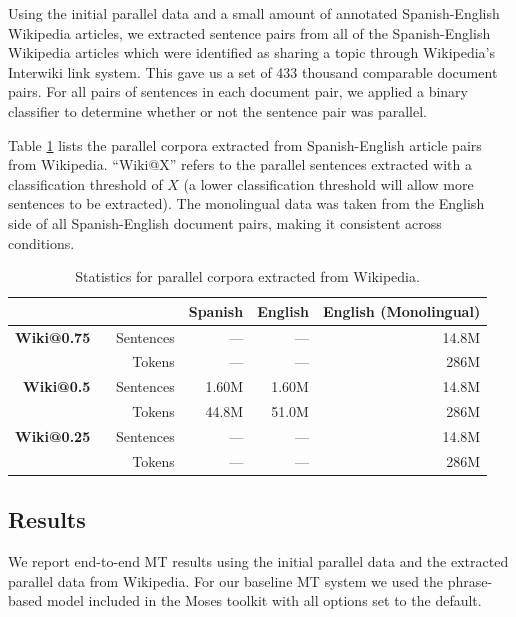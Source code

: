 Using the initial parallel data and a small amount of annotated Spanish-English
Wikipedia articles, we extracted sentence pairs from all of the Spanish-English
Wikipedia articles which were identified as sharing a topic through Wikipedia's
Interwiki link system. This gave us a set of 433 thousand comparable document
pairs. For all pairs of sentences in each document pair, we applied a binary
classifier to determine whether or not the sentence pair was parallel.

Table \ref{table:esen_wiki_parallel} lists the parallel corpora extracted from
Spanish-English article pairs from Wikipedia. ``Wiki@X'' refers to the parallel
sentences extracted with a classification threshold of $X$ (a lower
classification threshold will allow more sentences to be extracted). The
monolingual data was taken from the English side of all Spanish-English document
pairs, making it consistent across conditions.

\begin{table}[ht]
\begin{center}
\begin{tabular}{|rr||r|r|r|}
\hline
      &                & Spanish        & English & English (Monolingual) \\
\hline
\textbf{Wiki@0.75} \
      & Sentences     &   ---     & --- & 14.8M     \\
      & Tokens     &  ---      & --- & 286M    \\
\hline
\textbf{Wiki@0.5} \
      & Sentences     & 1.60M       & 1.60M & 14.8M     \\
      & Tokens     & 44.8M       & 51.0M & 286M     \\
\hline
\textbf{Wiki@0.25} \
      & Sentences     &   ---     & --- & 14.8M     \\
      & Tokens     &  ---      & --- & 286M    \\
\hline
\end{tabular}
\end{center}
\caption{Statistics for parallel corpora extracted from Wikipedia.}
\label{table:esen_wiki_parallel}
\end{table}

\subsection{Results}
We report end-to-end MT results using the initial parallel data and the
extracted parallel data from Wikipedia. For our baseline MT system we used the
phrase-based model included in the Moses toolkit \citet{Koehn07} with all
options set to the default. %

